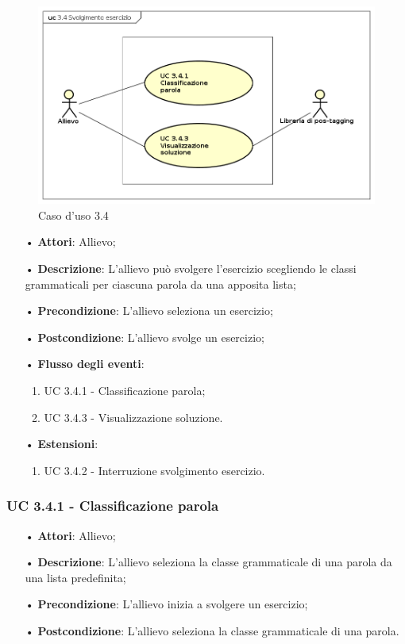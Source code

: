 \begin{figure}[H]
\centering
\includegraphics[width=17cm]{img/UC34.png} 
\caption{Caso d'uso 3.4}\label{fig:34}
\end{figure}

\begin{itemize}
\item[•]\textbf{Attori}: Allievo;
\item[•]\textbf{Descrizione}: L'allievo può svolgere l'esercizio scegliendo le classi grammaticali per ciascuna parola da una apposita lista;
\item[•]\textbf{Precondizione}: L'allievo seleziona un esercizio;
\item[•]\textbf{Postcondizione}: L'allievo svolge un esercizio;
\item[•]\textbf{Flusso degli eventi}:
\begin{enumerate}
\item UC 3.4.1 - Classificazione parola;
\item UC 3.4.3 - Visualizzazione soluzione.  %
\end{enumerate}
\item[•]\textbf{Estensioni}:
\begin{enumerate}
\item UC 3.4.2 - Interruzione svolgimento esercizio.
\end{enumerate}
\end{itemize}

\subsubsection{UC 3.4.1 - Classificazione parola}
\begin{itemize}
\item[•]\textbf{Attori}: Allievo;
\item[•]\textbf{Descrizione}: L'allievo seleziona la classe grammaticale di una parola da una lista predefinita;
\item[•]\textbf{Precondizione}: L'allievo inizia a svolgere un esercizio;
\item[•]\textbf{Postcondizione}: L'allievo seleziona la classe grammaticale di una parola.
\end{itemize}

